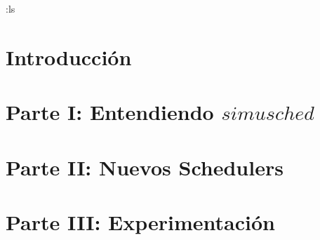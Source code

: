\documentclass[11pt, a4paper]{article}
\begin{document}

\maketitle
\newpage
\tableofcontents
\newpage

:ls
\section{Introducción}

\section{Parte I: Entendiendo $simusched$}

\section{Parte II: Nuevos Schedulers}

\section{Parte III: Experimentación}
	
\end{document}
